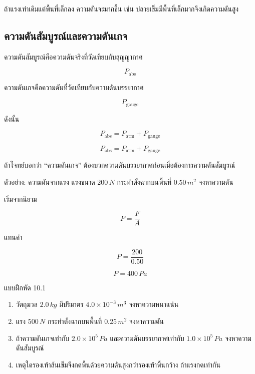 ถ้าแรงเท่าเดิมแต่พื้นที่เล็กลง ความดันจะมากขึ้น เช่น ปลายเข็มมีพื้นที่เล็กมากจึงเกิดความดันสูง

\subsection{ความดันสัมบูรณ์และความดันเกจ}

ความดันสัมบูรณ์คือความดันจริงที่วัดเทียบกับสุญญากาศ

\[
P_{\text{abs}}
\]

ความดันเกจคือความดันที่วัดเทียบกับความดันบรรยากาศ

\[
P_{\text{gauge}}
\]

ดังนั้น

\[
P_{\text{abs}}=P_{\text{atm}}+P_{\text{gauge}}
\]

\begin{tcolorbox}[title=ความดันสัมบูรณ์และความดันเกจ]
\[
P_{\text{abs}}=P_{\text{atm}}+P_{\text{gauge}}
\]

ถ้าโจทย์บอกว่า ``ความดันเกจ'' ต้องบวกความดันบรรยากาศก่อนเมื่อต้องการความดันสัมบูรณ์
\end{tcolorbox}

\begin{examplebox}{ตัวอย่าง: ความดันจากแรง}
แรงขนาด $200\,\si{N}$ กระทำตั้งฉากบนพื้นที่ $0.50\,\si{m^2}$ จงหาความดัน

เริ่มจากนิยาม

\[
P=\frac{F}{A}
\]

แทนค่า

\[
P=\frac{200}{0.50}
\]

\[
P=400\,\si{Pa}
\]
\end{examplebox}

\begin{exercisebox}{แบบฝึกหัด 10.1}
\begin{enumerate}
    \item วัตถุมวล $2.0\,\si{kg}$ มีปริมาตร $4.0\times 10^{-3}\,\si{m^3}$ จงหาความหนาแน่น
    \item แรง $500\,\si{N}$ กระทำตั้งฉากบนพื้นที่ $0.25\,\si{m^2}$ จงหาความดัน
    \item ถ้าความดันเกจเท่ากับ $2.0\times 10^5\,\si{Pa}$ และความดันบรรยากาศเท่ากับ $1.0\times 10^5\,\si{Pa}$ จงหาความดันสัมบูรณ์
    \item เหตุใดรองเท้าส้นเข็มจึงกดพื้นด้วยความดันสูงกว่ารองเท้าพื้นกว้าง ถ้าแรงกดเท่ากัน
\end{enumerate}
\end{exercisebox}

